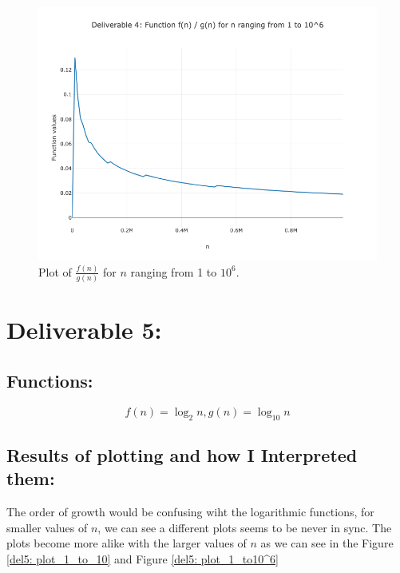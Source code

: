 \documentclass{article}
\begin{document}
\begin{figure}[H]
    \centering
    \includegraphics[width=\textwidth]{Deliverable 41: plot_1_to_1000000.png}
    \caption{Plot of \(\frac{f(n)}{g(n)}\) for $n$ ranging from 1 to $10^6$.}
    \label{del41: plot_1_to10^6}
\end{figure}

\section{Deliverable 5:}
\subsection{Functions: }
\[
    f(n) = \log_{2}{n}, g(n) = \log_{10}{n}
\]

\subsection{Results of plotting and how I Interpreted them: }
The order of growth would be confusing wiht the logarithmic functions, for smaller values of \(n\), we can see a different plots seems to be never in sync. The plots become more alike with the larger values of \(n\) as we can see in the Figure \ref{del5: plot_1_to_10} and Figure \ref{del5: plot_1_to10^6}
\end{document}
